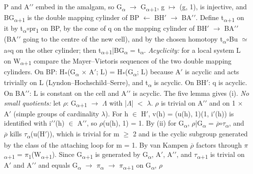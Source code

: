 P and A\ensuremath{\prime\prime} embed in the amalgam, so G\textsubscript{\ensuremath{\alpha}} \ensuremath{\to} G\textsubscript{\ensuremath{\alpha}+1}, g \ensuremath{\mapsto} (g, 1), is injective, and BG\textsubscript{\ensuremath{\alpha}+1} is the double mapping cylinder of BP \ensuremath{\leftarrow} BH\ensuremath{\prime} \ensuremath{\to} BA\ensuremath{\prime\prime}. Define t\textsubscript{\ensuremath{\alpha}+1} on it by t\textsubscript{\ensuremath{\alpha}}\ensuremath{\circ}pr\textsubscript{1} on BP, by the cone of q on the mapping cylinder of BH\ensuremath{\prime} \ensuremath{\to} BA\ensuremath{\prime\prime} (BA\ensuremath{\prime\prime} going to the centre of the new cell), and by the chosen homotopy t\textsubscript{\ensuremath{\alpha}}\ensuremath{\circ}Bu \ensuremath{\simeq} a\ensuremath{\circ}q on the other cylinder; then t\textsubscript{\ensuremath{\alpha}+1}|BG\textsubscript{\ensuremath{\alpha}} = t\textsubscript{\ensuremath{\alpha}}. \emph{Acyclicity:} for a local system L on W\textsubscript{\ensuremath{\alpha}+1} compare the Mayer--Vietoris sequences of the two double mapping cylinders. On BP: H\textsubscript{*}(G\textsubscript{\ensuremath{\alpha}} \ensuremath{\times} A\ensuremath{\prime}; L) = H\textsubscript{*}(G\textsubscript{\ensuremath{\alpha}}; L) because A\ensuremath{\prime} is acyclic and acts trivially on L (Lyndon--Hochschild--Serre), and t\textsubscript{\ensuremath{\alpha}} is acyclic. On BH\ensuremath{\prime}: q is acyclic. On BA\ensuremath{\prime\prime}: L is constant on the cell and A\ensuremath{\prime\prime} is acyclic. The five lemma gives (i). \emph{No small quotients:} let \ensuremath{\rho}: G\textsubscript{\ensuremath{\alpha}+1} \ensuremath{\to} \ensuremath{\Lambda} with |\ensuremath{\Lambda}| \ensuremath{<} \ensuremath{\lambda}. \ensuremath{\rho} is trivial on A\ensuremath{\prime\prime} and on 1 \ensuremath{\times} A\ensuremath{\prime} (simple groups of cardinality \ensuremath{\lambda}). For h \ensuremath{\in} H\ensuremath{\prime}, v(h) = (u(h), 1)(1, i\ensuremath{\prime}(h)) is identified with i\ensuremath{\prime\prime}(h) \ensuremath{\in} A\ensuremath{\prime\prime}, so \ensuremath{\rho}(u(h), 1) = 1. By (ii) for G\textsubscript{\ensuremath{\alpha}}, \ensuremath{\rho}|G\textsubscript{\ensuremath{\alpha}} = \ensuremath{\overline{\rho}}\ensuremath{\circ}\ensuremath{\tau}\textsubscript{\ensuremath{\alpha}}, and \ensuremath{\overline{\rho}} kills \ensuremath{\tau}\textsubscript{\ensuremath{\alpha}}(u(H\ensuremath{\prime})), which is trivial for m \ensuremath{\geq} 2 and is the cyclic subgroup generated by the class of the attaching loop for m = 1. By van Kampen \ensuremath{\overline{\rho}} factors through \ensuremath{\pi}\textsubscript{\ensuremath{\alpha}+1} = \ensuremath{\pi}\textsubscript{1}(W\textsubscript{\ensuremath{\alpha}+1}). Since G\textsubscript{\ensuremath{\alpha}+1} is generated by G\textsubscript{\ensuremath{\alpha}}, A\ensuremath{\prime}, A\ensuremath{\prime\prime}, and \ensuremath{\tau}\textsubscript{\ensuremath{\alpha}+1} is trivial on A\ensuremath{\prime} and A\ensuremath{\prime\prime} and equals G\textsubscript{\ensuremath{\alpha}} \ensuremath{\to} \ensuremath{\pi}\textsubscript{\ensuremath{\alpha}} \ensuremath{\to} \ensuremath{\pi}\textsubscript{\ensuremath{\alpha}+1} on G\textsubscript{\ensuremath{\alpha}}, \ensuremath{\rho} 